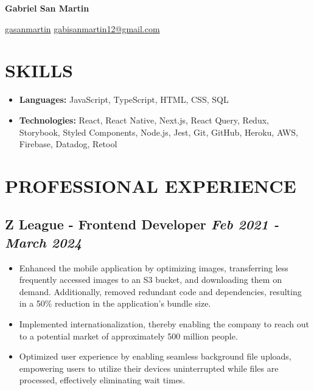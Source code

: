 \documentclass[10pt, a4paper]{article}
\begin{document}
\begin{center}
    \textbf{\Huge Gabriel San Martin} \\ \vspace{3pt}

    \small
    \faLinkedin \hspace{.5pt} \href{https://www.linkedin.com/in/gasanmartin}{gasanmartin}
    \vline \hspace{.5pt}
    \faEnvelope \hspace{.5pt} \href{mailto:gabisanmartin12@gmail.com}{gabisanmartin12@gmail.com}
\end{center}

\section{SKILLS}

\begin{itemize}
    \setlength\itemsep{0em}
    \item \textbf{Languages:} JavaScript, TypeScript, HTML, CSS, SQL
    \item \textbf{Technologies:} React, React Native, Next.js, React Query, Redux, Storybook, Styled Components, Node.js, Jest, Git, GitHub, Heroku, AWS, Firebase, Datadog, Retool
\end{itemize}

\section{PROFESSIONAL EXPERIENCE}

\subsection*{Z League - Frontend Developer \hfill \small \textit{Feb 2021 - March 2024}}

\begin{itemize}
    \setlength\itemsep{0em}
    \item Enhanced the mobile application by optimizing images, transferring less frequently accessed images to an S3 bucket, and downloading them on demand. Additionally, removed redundant code and dependencies, resulting in a 50\% reduction in the application's bundle size.
    \item Implemented internationalization, thereby enabling the company to reach out to a potential market of approximately 500 million people.
    \item Optimized user experience by enabling seamless background file uploads, empowering users to utilize their devices uninterrupted while files are processed, effectively eliminating wait times.
\end{itemize}
\end{document}
